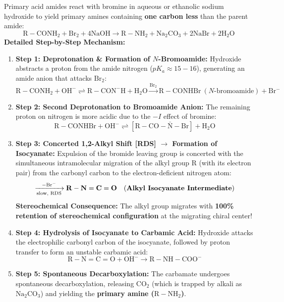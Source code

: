 \documentclass[10pt,a4paper]{article}
\begin{document}
\begin{conceptbox}
Primary acid amides react with bromine in aqueous or ethanolic sodium hydroxide to yield primary amines containing \textbf{one carbon less} than the parent amide:
\begin{equation}
  \mathrm{R-CONH_2} + \mathrm{Br_2} + 4\mathrm{NaOH} \to \mathrm{R-NH_2} + \mathrm{Na_2CO_3} + 2\mathrm{NaBr} + 2\mathrm{H_2O}
\end{equation}
\textbf{Detailed Step-by-Step Mechanism:}
\begin{enumerate}[leftmargin=*]
  \item \textbf{Step 1: Deprotonation \& Formation of $N$-Bromoamide:}
  Hydroxide abstracts a proton from the amide nitrogen ($pK_a \approx 15-16$), generating an amide anion that attacks $\mathrm{Br_2}$:
  \begin{equation}
    \mathrm{R-CONH_2} + \mathrm{OH^-} \rightleftharpoons \mathrm{R-CON^-H} + \mathrm{H_2O} \xrightarrow{\mathrm{Br_2}} \mathrm{R-CONHBr} \ (N\text{-bromoamide}) + \mathrm{Br^-}
  \end{equation}
  \item \textbf{Step 2: Second Deprotonation to Bromoamide Anion:}
  The remaining proton on nitrogen is more acidic due to the $-I$ effect of bromine:
  \begin{equation}
    \mathrm{R-CONHBr} + \mathrm{OH^-} \rightleftharpoons [\mathrm{R-CO-\bar{N}-Br}] + \mathrm{H_2O}
  \end{equation}
  \item \textbf{Step 3: Concerted 1,2-Alkyl Shift [RDS] $\to$ Formation of Isocyanate:}
  Expulsion of the bromide leaving group is concerted with the simultaneous intramolecular migration of the alkyl group $\mathrm{R}$ (with its electron pair) from the carbonyl carbon to the electron-deficient nitrogen atom:
  \begin{equation}
    [\mathrm{R-CO-\bar{N}-Br}] \xrightarrow[\text{slow, RDS}]{-\mathrm{Br^-}} \mathbf{R-N=C=O} \quad (\text{\textbf{Alkyl Isocyanate Intermediate}})
  \end{equation}
  \textbf{Stereochemical Consequence:} The alkyl group migrates with \textbf{100\% retention of stereochemical configuration} at the migrating chiral center!
  \item \textbf{Step 4: Hydrolysis of Isocyanate to Carbamic Acid:}
  Hydroxide attacks the electrophilic carbonyl carbon of the isocyanate, followed by proton transfer to form an unstable carbamic acid:
  \begin{equation}
    \mathrm{R-N=C=O} + \mathrm{OH^-} \to \mathrm{R-NH-COO^-}
  \end{equation}
  \item \textbf{Step 5: Spontaneous Decarboxylation:}
  The carbamate undergoes spontaneous decarboxylation, releasing $\mathrm{CO_2}$ (which is trapped by alkali as $\mathrm{Na_2CO_3}$) and yielding the \textbf{primary amine ($\mathrm{R-NH_2}$)}.
\end{enumerate}
\end{conceptbox}
\end{document}
